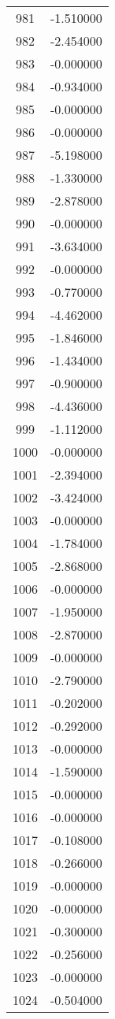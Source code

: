 \documentclass[12pt]{article}
\begin{document}
\begin{longtable}{@{}cc@{}}
981 & -1.510000 \\
982 & -2.454000 \\
983 & -0.000000 \\
984 & -0.934000 \\
985 & -0.000000 \\
986 & -0.000000 \\
987 & -5.198000 \\
988 & -1.330000 \\
989 & -2.878000 \\
990 & -0.000000 \\
991 & -3.634000 \\
992 & -0.000000 \\
993 & -0.770000 \\
994 & -4.462000 \\
995 & -1.846000 \\
996 & -1.434000 \\
997 & -0.900000 \\
998 & -4.436000 \\
999 & -1.112000 \\
1000 & -0.000000 \\
1001 & -2.394000 \\
1002 & -3.424000 \\
1003 & -0.000000 \\
1004 & -1.784000 \\
1005 & -2.868000 \\
1006 & -0.000000 \\
1007 & -1.950000 \\
1008 & -2.870000 \\
1009 & -0.000000 \\
1010 & -2.790000 \\
1011 & -0.202000 \\
1012 & -0.292000 \\
1013 & -0.000000 \\
1014 & -1.590000 \\
1015 & -0.000000 \\
1016 & -0.000000 \\
1017 & -0.108000 \\
1018 & -0.266000 \\
1019 & -0.000000 \\
1020 & -0.000000 \\
1021 & -0.300000 \\
1022 & -0.256000 \\
1023 & -0.000000 \\
1024 & -0.504000 \\

\end{longtable}
\end{document}
